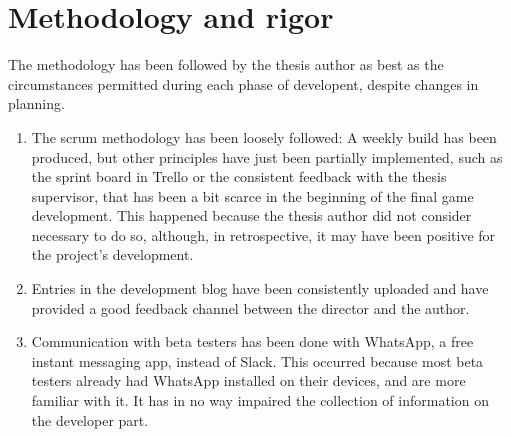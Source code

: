 \chapter{Methodology and rigor}

The methodology has been followed by the thesis author as best as
the circumstances permitted during each phase of developent, despite
changes in planning.

\begin{enumerate}

\item The scrum methodology has been loosely followed: A weekly build has
been produced, but other principles have just been partially implemented, such as the sprint board in Trello
or the consistent feedback with the thesis supervisor, that has been a bit scarce in the beginning of the final game development. This happened because the thesis author did not consider necessary to do so, although, in retrospective, it may have been positive for the project's development.

\item Entries in the development blog have been consistently uploaded and have provided
a good feedback channel between the director and the author.

\item Communication with beta testers has been done with WhatsApp, a free instant messaging app, instead of Slack. This occurred because most beta testers already had WhatsApp installed on their devices, and are more familiar with it. It has in no way impaired the collection of information on the developer part.

\end{enumerate}
